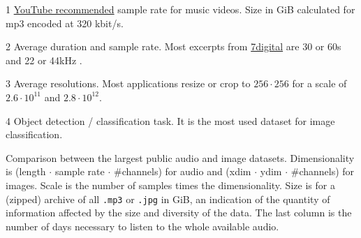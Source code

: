 \documentclass{article}
\begin{document}
\begin{table}[t]
\begin{threeparttable}
	\begin{tablenotes}
		\item[1] \href{https://support.google.com/youtube/answer/6039860}{YouTube recommended} sample rate for music videos. Size in GiB calculated for mp3 encoded at 320 kbit/s.
		\item[2] Average duration and sample rate. Most excerpts from \href{https://www.7digital.com}{7digital} are 30 or 60s and 22 or 44kHz \cite{msd_features}.
		\item[3] Average resolutions. Most applications resize or crop to $256\cdot256$ for a scale of $2.6\cdot10^{11}$ and $2.8\cdot10^{12}$.
		\item[4] Object detection / classification task. It is the most used dataset for image classification.
	\end{tablenotes}
	\end{threeparttable}
	\caption{Comparison between the largest public audio and image datasets. Dimensionality is (length $\cdot$ sample rate $\cdot$ \#channels) for audio and (xdim $\cdot$ ydim $\cdot$ \#channels) for images. Scale is the number of samples times the dimensionality. Size is for a (zipped) archive of all \texttt{.mp3} or \texttt{.jpg} in GiB, an indication of the quantity of information affected by the size and diversity of the data. The last column is the number of days necessary to listen to the whole available audio.}
	\label{tab:size}
\end{table}

\end{document}
